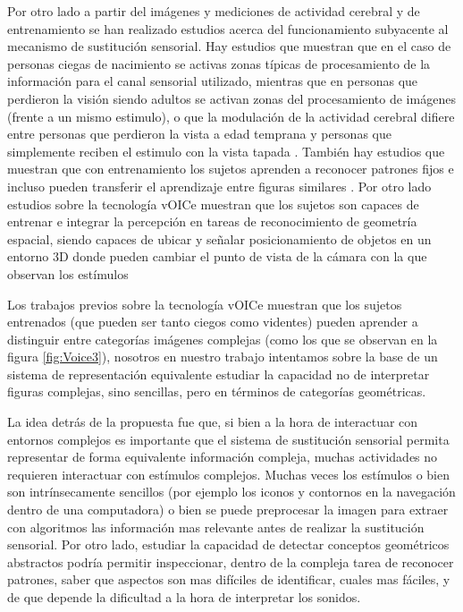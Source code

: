 \documentclass{article}
\begin{document}
    Por otro lado a partir del imágenes y mediciones de actividad cerebral y de entrenamiento se han realizado estudios acerca del funcionamiento subyacente al mecanismo de sustitución sensorial. Hay estudios que muestran que en el caso de personas ciegas de nacimiento se activas zonas típicas de procesamiento de la información para el canal sensorial utilizado, mientras que en personas que perdieron la visión siendo adultos se activan zonas del procesamiento de imágenes (frente a un mismo estimulo), o que la modulación de la actividad cerebral difiere entre personas que perdieron la vista a edad temprana y personas que simplemente reciben el estimulo con la vista tapada \cite{VoiceSubyacente1,VoiceSubyacente3}. También hay estudios que muestran que con entrenamiento los sujetos aprenden a reconocer patrones fijos e incluso pueden transferir el aprendizaje entre figuras similares \cite{VoiceSubyacente2}. Por otro lado estudios sobre la tecnología vOICe muestran que los sujetos son capaces de entrenar e integrar la percepción en tareas de reconocimiento de geometría espacial, siendo capaces de ubicar y señalar posicionamiento de objetos en un entorno 3D donde pueden cambiar el punto de vista de la cámara con la que observan los estímulos \cite{VoiceSubyacente4}
    
    Los trabajos previos sobre la tecnología vOICe muestran que los sujetos entrenados (que pueden ser tanto ciegos como videntes\cite{VoiceEntrenamiento1}) pueden aprender a distinguir entre categorías imágenes complejas \cite{VoiceEntrenamiento2} (como los que se observan en la figura \ref{fig:Voice3}), nosotros en nuestro trabajo intentamos sobre la base de un sistema de representación equivalente estudiar la capacidad no de interpretar figuras complejas, sino sencillas, pero en términos de categorías geométricas. 
    
    La idea detrás de la propuesta fue que, si bien a la hora de interactuar con entornos complejos es importante que el sistema de sustitución sensorial permita representar de forma equivalente información compleja, muchas actividades no requieren interactuar con estímulos complejos. Muchas veces los estímulos o bien son intrínsecamente sencillos (por ejemplo los iconos y contornos en la navegación dentro de una computadora) o bien se puede preprocesar la imagen para extraer con algoritmos las información mas relevante antes de realizar la sustitución sensorial. Por otro lado, estudiar la capacidad de detectar conceptos geométricos abstractos podría permitir inspeccionar, dentro de la compleja tarea de reconocer patrones, saber que aspectos son mas difíciles de identificar, cuales mas fáciles, y de que depende la dificultad a la hora de interpretar los sonidos. 
    
\end{document}
